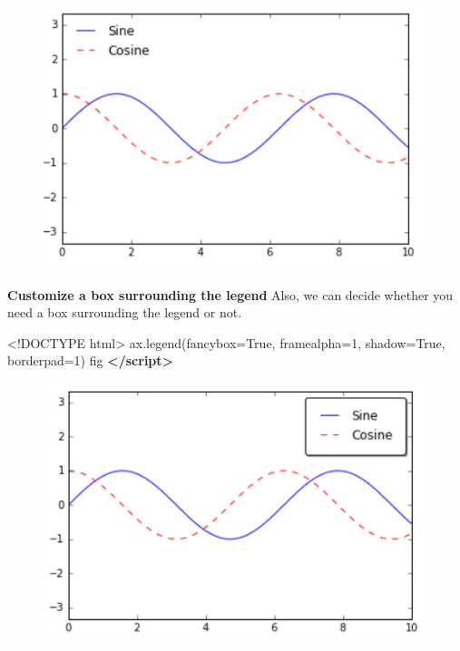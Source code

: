 \documentclass[]{book}
\newenvironment{Shaded}{\begin{snugshade}}{\end{snugshade}}
\newcommand{\KeywordTok}[1]{\textcolor[rgb]{0.13,0.29,0.53}{\textbf{#1}}}
\newcommand{\DataTypeTok}[1]{\textcolor[rgb]{0.13,0.29,0.53}{#1}}
\newcommand{\NormalTok}[1]{#1}
\theoremstyle{definition}
\theoremstyle{definition}
\theoremstyle{definition}
\theoremstyle{remark}
\begin{document}
\begin{figure}
\centering
\includegraphics{images/legend2.png}
\caption{}
\end{figure}

\textbf{Customize a box surrounding the legend} Also, we can decide
whether you need a box surrounding the legend or not.

\begin{Shaded}
\begin{Highlighting}[]
\DataTypeTok{<!DOCTYPE }\NormalTok{html}\DataTypeTok{>}
\NormalTok{ax.legend(fancybox=True, framealpha=1, shadow=True, borderpad=1)}
\NormalTok{fig}
\KeywordTok{</script>}
\end{Highlighting}
\end{Shaded}

\begin{figure}
\centering
\includegraphics{images/legend3.png}
\caption{}
\end{figure}
\end{document}
